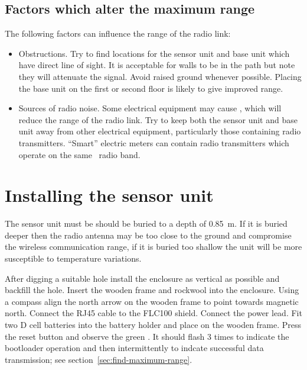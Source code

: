 
\subsection{Factors which alter the maximum range}
The following factors can influence the range of the radio link:
\begin{itemize}
\item Obstructions. Try to find locations for the sensor unit and base
  unit which have direct line of sight. It is acceptable for walls to
  be in the path but note they will attenuate the signal. Avoid raised
  ground whenever possible. Placing the base unit on the first or
  second floor is likely to give improved range.
\item Sources of radio noise. Some electrical equipment may cause
  \rfi, which will reduce the range of the radio link. Try to keep
  both the sensor unit and base unit away from other electrical
  equipment, particularly those containing radio
  transmitters. ``Smart'' electric meters can contain radio
  transmitters which operate on the same  \ism\ radio band.
\end{itemize}


\section{Installing the sensor unit}

The sensor unit must be should be buried to a depth of
\SI{0.85}{\metre}. If it is buried deeper then the radio antenna may
be too close to the ground and compromise the wireless communication
range, if it is buried too shallow the unit will be more susceptible
to temperature variations.

After digging a suitable hole install the enclosure as vertical as
possible and backfill the hole. Insert the wooden frame and rockwool
into the enclosure. Using a compass align the north arrow on the
wooden frame to point towards magnetic north. Connect the RJ45 cable
to the FLC100 shield. Connect the power lead. Fit two D cell batteries
into the battery holder and place on the wooden frame. Press the reset
button and observe the green \led. It should flash 3 times to indicate
the bootloader operation and then intermittently to indcate
successful data transmission; see section~\ref{sec:find-maximum-range}.





